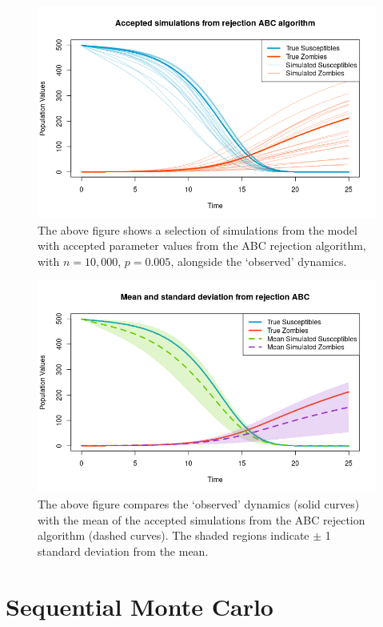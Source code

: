 \documentclass[]{article}
\begin{document}
\begin{figure}[H]
\centering
\includegraphics[width=0.8\linewidth]{../Figures/rej_ABC_simulations}
\caption{The above figure shows a selection of simulations from the model with accepted parameter values from the ABC rejection algorithm, with $n=10,000$, $p=0.005$, alongside the `observed' dynamics.}
\label{rej_abc_acc_simulations}
\end{figure}

\begin{figure}[H]
	\centering
	\includegraphics[width=0.8\linewidth]{../Figures/rej_abc_sd_bands}
	\caption{The above figure compares the `observed' dynamics (solid curves) with the mean of the accepted simulations from the ABC rejection algorithm (dashed curves). The shaded regions indicate $\pm$ 1 standard deviation from the mean.}
	\label{rej_abc_sd}
\end{figure}




\section{Sequential Monte Carlo}
\end{document}
